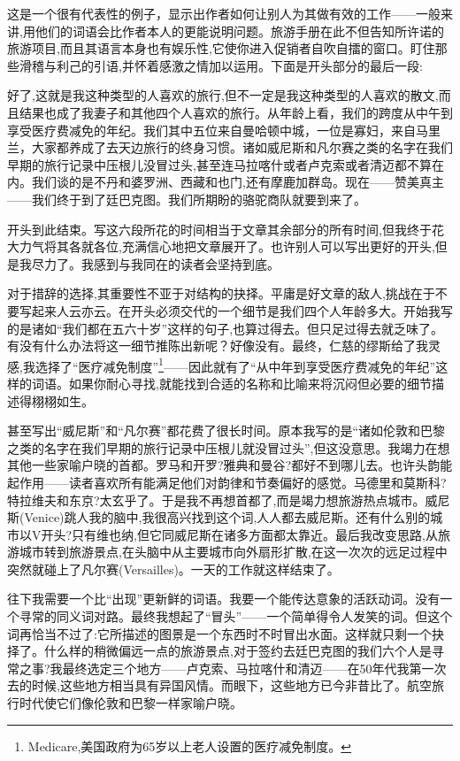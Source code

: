 这是一个很有代表性的例子，显示出作者如何让别人为其做有效的工作——一般来讲,用他们的词语会比作者本人的更能说明问题。旅游手册在此不但告知所许诺的旅游项目,而且其语言本身也有娱乐性,它使你进入促销者自吹自擂的窗口。盯住那些滑稽与利己的引语,并怀着感激之情加以运用。下面是开头部分的最后一段:

好了,这就是我这种类型的人喜欢的旅行,但不一定是我这种类型的人喜欢的散文,而且结果也成了我妻子和其他四个人喜欢的旅行。从年龄上看，我们的跨度从中午到享受医疗费减免的年纪。我们其中五位来自曼哈顿中城，一位是寡妇，来自马里兰，大家都养成了去天边旅行的终身习惯。诸如威尼斯和凡尔赛之类的名字在我们早期的旅行记录中压根儿没冒过头,甚至连马拉喀什或者卢克索或者清迈都不算在内。我们谈的是不丹和婆罗洲、西藏和也门,还有摩鹿加群岛。现在——赞美真主——我们终于到了廷巴克图。我们所期盼的骆驼商队就要到来了。

开头到此结束。写这六段所花的时间相当于文章其余部分的所有时间,但我终于花大力气将其各就各位,充满信心地把文章展开了。也许别人可以写出更好的开头,但是我尽力了。我感到与我同在的读者会坚持到底。

对于措辞的选择,其重要性不亚于对结构的抉择。平庸是好文章的敌人,挑战在于不要写起来人云亦云。在开头必须交代的一个细节是我们四个人年龄多大。开始我写的是诸如“我们都在五六十岁”这样的句子,也算过得去。但只足过得去就乏味了。有没有什么办法将这一细节推陈出新呢？好像没有。最终，仁慈的缪斯给了我灵感,我选择了“医疗减免制度”\footnote{Medicare,美国政府为65岁以上老人设置的医疗减免制度。}——因此就有了“从中年到享受医疗费减免的年纪”这样的词语。如果你耐心寻找,就能找到合适的名称和比喻来将沉闷但必要的细节描述得栩栩如生。

甚至写出“威尼斯”和“凡尔赛”都花费了很长时间。原本我写的是“诸如伦敦和巴黎之类的名字在我们早期的旅行记录中压根儿就没冒过头”,但这没意思。我竭力在想其他一些家喻户晓的首都。罗马和开罗?雅典和曼谷?都好不到哪儿去。也许头韵能起作用——读者喜欢所有能满足他们对韵律和节奏偏好的感觉。马德里和莫斯科?特拉维夫和东京?太玄乎了。于是我不再想首都了,而是竭力想旅游热点城市。威尼斯(Venice)跳人我的脑中,我很高兴找到这个词,人人都去威尼斯。还有什么别的城市以V开头?只有维也纳,但它同威尼斯在诸多方面都太靠近。最后我改变思路,从旅游城市转到旅游景点,在头脑中从主要城市向外扇形扩散,在这一次次的远足过程中突然就碰上了凡尔赛(Versailles)。一天的工作就这样结束了。

往下我需要一个比“出现”更新鲜的词语。我要一个能传达意象的活跃动词。没有一个寻常的同义词对路。最终我想起了“冒头”——一个简单得令人发笑的词。但这个词再恰当不过了:它所描述的图景是一个东西时不时冒出水面。这样就只剩一个抉择了。什么样的稍微偏远一点的旅游景点,对于签约去廷巴克图的我们六个人是寻常之事?我最终选定三个地方——卢克索、马拉喀什和清迈——在50年代我第一次去的时候,这些地方相当具有异国风情。而眼下，这些地方已今非昔比了。航空旅行时代使它们像伦敦和巴黎一样家喻户晓。

